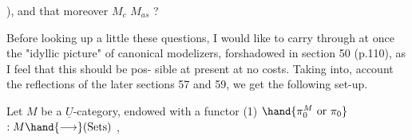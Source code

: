 
\hand{\uline{\textcolor{black}{tible}}}), and that moreover $M_c$ \hand{\uline{\textcolor{black}{generates}}} $M_{as}$ ?


Before looking up a little these questions, I would like   to
carry through at once the "idyllic picture" of canonical modelizers,
 forshadowed in section 50 (p.110), as I feel that this should be pos-%
sible at present at no costs. Taking into, account the reflections of
the later sections 57 and 59, we get the following set-up.

Let $M$ be a $\underline{U}$-category, endowed with a functor
(1) \quad $\hand{\pi_0^M \text{ or } \pi_0}$  $: M \hand{\longrightarrow} (\mathrm{Sets})$ ,

